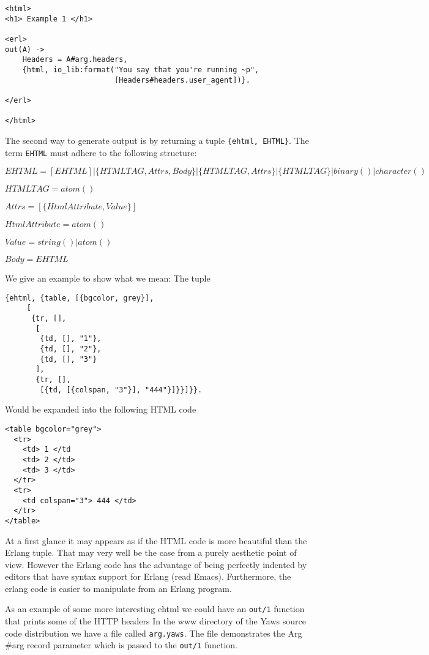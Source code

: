 \documentclass[11pt,oneside,english]{book}
\begin{document}
\begin{verbatim}
<html>
<h1> Example 1 </h1>

<erl>
out(A) ->
    Headers = A#arg.headers,
    {html, io_lib:format("You say that you're running ~p",
                         [Headers#headers.user_agent])}.

</erl>

</html>

\end{verbatim}


The second way to generate output is by returning a tuple
\verb+{ehtml, EHTML}+. The term \verb+EHTML+ must adhere to the 
following structure:

$EHTML = [EHTML] | \{HTMLTAG, Attrs, Body\} | 
                   \{HTMLTAG, Attrs\} | \{HTMLTAG\} |
        binary() | character()$

$HTMLTAG 	 = atom()$

$Attrs = [\{HtmlAttribute, Value\}]$

$HtmlAttribute 	 = atom()$

$Value = string() | atom()$

$Body  = EHTML$

We give an example to show what we mean:
The tuple 
\begin{verbatim}
{ehtml, {table, [{bgcolor, grey}],
	 [
	  {tr, [], 
	   [
	    {td, [], "1"},
	    {td, [], "2"},
	    {td, [], "3"}
	   ],
	   {tr, [],
	    [{td, [{colspan, "3"}], "444"}]}}]}}.
\end{verbatim}

Would be expanded into the following HTML code
\begin{verbatim}
<table bgcolor="grey">
  <tr>
    <td> 1 </td
    <td> 2 </td>
    <td> 3 </td>
  </tr>
  <tr>
    <td colspan="3"> 444 </td>
  </tr>
</table>

\end{verbatim}

At a first glance it may appears as if the HTML code is more
beautiful than the Erlang tuple. That may very well be the
case from a purely aesthetic point of view. However the
Erlang code has the advantage of being perfectly indented by editors
that have syntax support for Erlang (read Emacs). Furthermore, the erlang
code is easier to manipulate from an Erlang program.

As an example of some more interesting ehtml we could have
an \verb+out/1+ function that prints some of the HTTP headers
In the www directory of the Yaws source code distribution we have
a file called \verb+arg.yaws+. The file demonstrates the Arg \#arg record
parameter which is passed to the \verb+out/1+ function.
\end{document}

